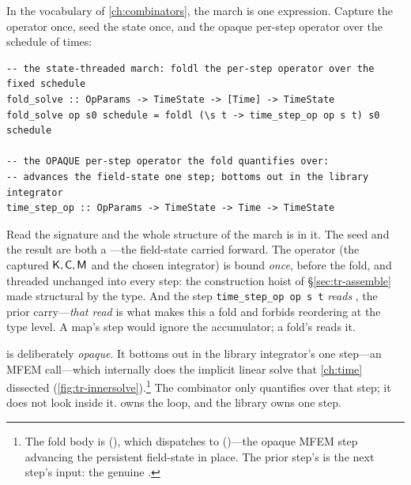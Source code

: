 In the vocabulary of \cref{ch:combinators}, the march is one expression. Capture
the operator once, seed the state once, and  the opaque per-step
operator over the schedule of times:
\begin{lstlisting}[style=l4style]
-- the state-threaded march: foldl the per-step operator over the fixed schedule
fold_solve :: OpParams -> TimeState -> [Time] -> TimeState
fold_solve op s0 schedule = foldl (\s t -> time_step_op op s t) s0 schedule

-- the OPAQUE per-step operator the fold quantifies over:
-- advances the field-state one step; bottoms out in the library integrator
time_step_op :: OpParams -> TimeState -> Time -> TimeState
\end{lstlisting}
Read the signature and the whole structure of the march is in it. The seed
 and the result are both a ---the field-state carried
forward. The operator  (the captured $\mathsf{K},\mathsf{C},\mathsf{M}$ and the chosen
integrator) is bound \emph{once}, before the fold, and threaded unchanged into every
step: the construction hoist of \S\ref{sec:tr-assemble} made structural by the type.
And the step \lstinline[style=l4style]|time_step_op op s t| \emph{reads} ,
the prior carry---\emph{that read} is what makes this a fold and forbids reordering
at the type level. A map's step would ignore the accumulator; a fold's reads it.

 is deliberately \emph{opaque}. It bottoms out in the library
integrator's one step---an MFEM  call---which internally does
the implicit linear solve that \cref{ch:time} dissected
(\cref{fig:tr-innersolve}).\footnote{The fold body is  (), which dispatches to
 ()---the
opaque MFEM step advancing the persistent  field-state in place. The prior
step's  is the next step's input: the genuine .} The
combinator only quantifies over that step; it does not look inside it.
 owns the loop, and the library owns one step.

